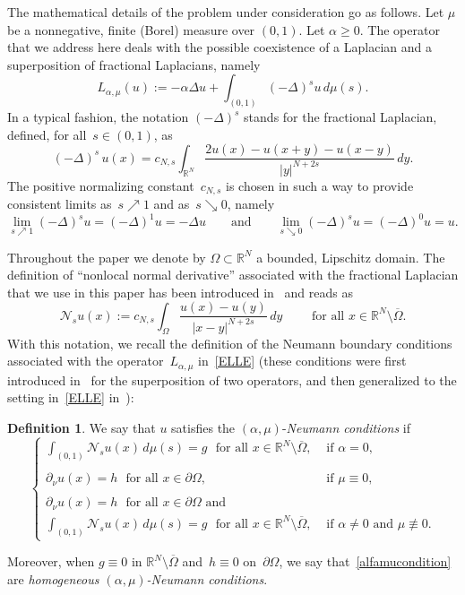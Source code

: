 \documentclass[12pt,a4paper,intlimits,sumlimits]{amsart}
\def \R {\mathbb{R}}
\def \Ns {\mathscr{N}_{s}}
\theoremstyle{definition}
\newtheorem{definition}{Definition}[section]
\theoremstyle{plain}
\numberwithin{equation}{section}
\renewcommand{\ge}{\geqslant}
\begin{document}
The mathematical details of the problem under consideration go as follows.
Let $\mu$ be a nonnegative, finite (Borel) measure over $(0, 1)$.
Let $\alpha \ge 0$. The operator that we address here deals with the possible coexistence of a Laplacian and a superposition of fractional Laplacians, namely
\begin{equation}\label{ELLE}
L_{\alpha, \mu} (u):= -\alpha\Delta u +\int_{(0, 1)} (-\Delta)^s u\, d\mu(s).
\end{equation}
In a typical fashion, the notation $(-\Delta)^s$ stands for the fractional Laplacian, defined, for all~$s\in (0, 1)$, as 
\begin{equation}\label{deflaplacianofrazionario}
(- \Delta)^s\, u(x) = c_{N,s}\int_{\R^N} \frac{2u(x) - u(x+y)-u(x-y)}{|y|^{N+2s}}\, dy.
\end{equation}
The positive normalizing constant~$c_{N,s}$ is chosen in such a way to provide
consistent limits as~$s\nearrow1$ and as~$s\searrow0$, namely
\[
\lim_{s\nearrow1}(-\Delta)^su=(-\Delta)^1u=-\Delta u
\qquad{\mbox{and}}\qquad
\lim_{s\searrow0}(-\Delta)^s u=(-\Delta)^0u=u.
\]

Throughout the paper we denote by $\Omega\subset\R^N$ a bounded, Lipschitz domain.
The definition of ``nonlocal normal derivative'' associated with the
fractional Laplacian that we use in this paper has been introduced in~\cite{MR3651008} and reads as
$$ \Ns u(x) :=c_{N,s}\int_{\Omega}\frac{u(x)-u(y)}{|x-y|^{N+2s}}\,dy
\qquad \mbox{ for all }x\in \R^N \setminus \overline{\Omega}.$$
With this notation, we recall the definition of the Neumann
boundary conditions associated with the operator~$L_{\alpha, \mu}$ in~\eqref{ELLE} (these conditions were first introduced  in~\cite{MR4651677}
for the superposition of two operators, and then generalized to the setting
in~\eqref{ELLE} in~\cite{TUTTI}):

\begin{definition}\label{NDEFN}
We say that $u$ satisfies the $(\alpha,\mu)$-\textit{Neumann conditions} if
\begin{equation}\label{alfamucondition}
\begin{cases}
\displaystyle\int_{(0,1)} \Ns u(x)\,d\mu(s)=g\,\, \mbox{ for all }x\in \R^N \setminus \overline{\Omega},    & \mbox{ if }\alpha=0,
\\ \\
\partial_\nu u(x)=h \,\, \mbox{ for all } x\in \partial\Omega,
&  \mbox{ if } \mu\equiv 0,
\\ \\
\partial_\nu u(x)=h \,\, \mbox{ for all } x\in \partial\Omega
 \mbox{ and } \\ 
 \displaystyle\int_{(0,1)} \Ns u(x)\,d\mu(s)=g\,\, \mbox{ for all }x\in \R^N \setminus \overline{\Omega},  
 &\mbox{ if } \alpha\neq 0 \mbox{ and } \mu\not \equiv 0.
\end{cases}
\end{equation}

Moreover, when $g\equiv 0$ in $\R^N\setminus \overline{\Omega}$ 
and~$h\equiv 0$ on~$\partial \Omega$, we say that~\eqref{alfamucondition} are \textit{homogeneous $(\alpha,\mu)$-Neumann conditions}.
\end{definition}
\end{document}

